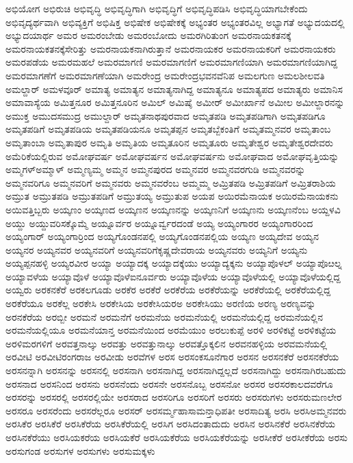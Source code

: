 {ಅಭಿಯೋಗ
ಅಭಿರುಚಿ
ಅಭಿವೃದ್ಧಿ
ಅಭಿವೃದ್ಧಿಗಾಗಿ
ಅಭಿವೃದ್ಧಿಗೆ
ಅಭಿವೃದ್ಧಿಪಡಿಸಿ
ಅಭಿವೃದ್ಧಿಯಾಗಬೇಕೆಂದು
ಅಭಿವೃದ್ಯರ್ಥವಾಗಿ
ಅಭಿವ್ಯಕ್ತಿಗೆ
ಅಭಿಷಿಕ್ತ
ಅಭಿಷೇಕ
ಅಭಿಷೇಕಕ್ಕೆ
ಅಭ್ಯಂತರ
ಅಭ್ಯಂತರವಿಲ್ಲ
ಅಭ್ಯಾಗತೆ
ಅಭ್ಯುದಯದಲ್ಲಿ
ಅಭ್ಯುದಯಾರ್ಥ
ಅಮರ
ಅಮರಂಬೇಡು
ಅಮರಂಬೋದು
ಅಮರಗಿರಿತುಂಗ
ಅಮರನಾಯಕತನಕ್ಕೆ
ಅಮರನಾಯಕತನಕ್ಕೆಸೇರಿತ್ತು
ಅಮರನಾಯಕನಾಗಿರುತ್ತಾನೆ
ಅಮರನಾಯಕರ
ಅಮರನಾಯಕರಿಗೆ
ಅಮರನಾಯಕರು
ಅಮರಪಡೆಯ
ಅಮರಮಹಲೆ
ಅಮರಮಾಗಣಿ
ಅಮರಮಾಗಣಿಗೆ
ಅಮರಮಾಗಣಿಯಾಗಿ
ಅಮರಮಾಗಣಿಯಾಗಿದ್ದ
ಅಮರಮಾಗಣೆಗೆ
ಅಮರಮಾಗಣೆಯಾಗಿ
ಅಮರೇಂದ್ರ
ಅಮರೇಂದ್ರಭವನವೆನಿಪ
ಅಮಲಗುಣ
ಅಮಲಶೀಲವತಿ
ಅಮಲ್ದಾರ್
ಅಮಳವೂರ್
ಅಮಾತ್ಯ
ಅಮಾತ್ಯನ
ಅಮಾತ್ಯನಾಗಿದ್ದ
ಅಮಾತ್ಯನೂ
ಅಮಾತ್ಯಪದ
ಅಮಾತ್ಯರು
ಅಮಾನಿಸ
ಅಮಾವಾಸ್ಯೆಯ
ಅಮಿತ್ತನೂರ
ಅಮಿತ್ತನೂರಿನ
ಅಮಿಲ್
ಅಮಿಷೈ
ಅಮೀರ್
ಅಮೀರ್ಖಾನೆ
ಅಮೀಲ
ಅಮೀಲ್ದಾರನನ್ನು
ಅಮುಕ್ತ
ಅಮುದಸಮುದ್ರ
ಅಮುಲ್ದಾರ್
ಅಮೃತನಾಥಪುರವಾದ
ಅಮೃತಪಡಿ
ಅಮೃತಪಡಿಗಾಗಿ
ಅಮೃತಪಡಿಗೂ
ಅಮೃತಪಡಿಗೆ
ಅಮೃತಪಡಿಯ
ಅಮೃತಪಡಿಯನೂ
ಅಮೃತಪ್ಪನ
ಅಮೃತಬ್ಬೆಕಂತಿಗೆ
ಅಮೃತಮ್ಮನವರ
ಅಮೃತಾಂಬ
ಅಮೃತಾಂಬಾ
ಅಮೃತಾಪುರ
ಅಮೃತಿ
ಅಮೃತಿಯ
ಅಮೃತೂರಿನ
ಅಮೃತೂರು
ಅಮೃತೇಶ್ವರ
ಅಮೃತೇಶ್ವರದೇವರು
ಅಮೆರಿಕೆಯಲ್ಲಿರುವ
ಅಮೋಘವರ್ಷ
ಅಮೋಘವರ್ಷನ
ಅಮೋಘವರ್ಷನು
ಅಮೋಘವಾದ
ಅಮೋಘವೃತ್ತಿಯನ್ನು
ಅಮ್ಮಗಳ್ಅಮ್ಮಾಳ್
ಅಮ್ಮಣ್ಯಮ್ಮ
ಅಮ್ಮನ
ಅಮ್ಮನಪುರದ
ಅಮ್ಮನವರ
ಅಮ್ಮನವರಗುಡಿ
ಅಮ್ಮನವರನ್ನು
ಅಮ್ಮನವರಿಗೂ
ಅಮ್ಮನವರಿಗೆ
ಅಮ್ಮನವರು
ಅಮ್ಮನವರೆಂಬ
ಅಮ್ಮಮ್ಮ
ಅಮ್ರಿತಪಡಿ
ಅಮ್ರಿತಪಡಿಗೆ
ಅಮ್ರಿತರಾಶಿಯ
ಅಮ್ರುತ
ಅಮ್ರುತಪಡಿ
ಅಮ್ರುತಪಡಿಗೆ
ಅಮ್ರುತಯ್ಯ
ಅಮ್ರುತುಪ
ಅಯಪ
ಅಯಿರಮೆನಾಯಕ
ಅಯಿರಮೆನಾಯಕನು
ಅಯಿವತ್ತಿಬ್ಬರು
ಅಯ್ಕಣಂ
ಅಯ್ಕಣದ
ಅಯ್ಕಣನ
ಅಯ್ಕಣನನ್ನು
ಅಯ್ಕಣನಿಗೆ
ಅಯ್ಕಣನು
ಅಯ್ಕಣನೆಂಬ
ಅಯ್ದಳವಿ
ಅಯ್ದು
ಅಯ್ದುವರಿಸಕ್ಕೊಮ್ಮೆ
ಅಯ್ನೂರ್ವರ
ಅಯ್ನೂರ್ವ್ವರದಂಡೆ
ಅಯ್ಯ
ಅಯ್ಯಂಗಾರರ
ಅಯ್ಯಂಗಾರರಿಂದ
ಅಯ್ಯಂಗಾರ್
ಅಯ್ಯಂಗಾರ್ರಿಂದ
ಅಯ್ಯಗೊಂಡನಪಲ್ಲಿ
ಅಯ್ಯಗೊಂಡನಪಲ್ಲಿಯ
ಅಯ್ಯಣ
ಅಯ್ಯದೇವ
ಅಯ್ಯನ
ಅಯ್ಯನರ
ಅಯ್ಯನವರ
ಅಯ್ಯನವರಿಗೆ
ಅಯ್ಯನವರಿಗೆಕೃಷ್ಣದೇವರಾಯ
ಅಯ್ಯನವರು
ಅಯ್ಯನಿಗೆ
ಅಯ್ಯನು
ಅಯ್ಯಪ್ಪನಹಳ್ಳಿ
ಅಯ್ಯರವೀರ
ಅಯ್ಯಾ
ಅಯ್ಯಾದಕ್ಕ
ಅಯ್ಯಾದಕ್ಕೆಯು
ಅಯ್ಯಾದ್ಯಕ್ಕನು
ಅಯ್ಯಾಪೊಳಲ್
ಅಯ್ಯಾಪೊೞಲ್ನ
ಅಯ್ಯಾವಳೆಯ
ಅಯ್ಯಾವೊಳೆ
ಅಯ್ಯಾವೊಳೆಐನೂರ್ವರು
ಅಯ್ಯಾವೊಳೆಯ
ಅಯ್ಯಾವೊಳೆಯಲ್ಲಿ
ಅಯ್ಯಾವೊಳೆಯಲ್ಲಿದ್ದ
ಅಯ್ವರು
ಅರಕನಕೆರೆ
ಅರಕಲಗೂಡು
ಅರಕೆರ
ಅರಕೆರೆ
ಅರಕೆರೆಯ
ಅರಕೆರೆಯನ್ನು
ಅರಕೆರೆಯಲ್ಲಿ
ಅರಕೆರೆಯಲ್ಲಿದ್ದ
ಅರಕೆರೆಯೂ
ಅರಕೆಲ್ಲ
ಅರಕೇಸಿ
ಅರಕೇಸಿಯ
ಅರಕೇಸಿಯರಅ
ಅರಕೇಸಿಯು
ಅರಣಿಯ
ಅರಣ್ಯ
ಅರಣ್ಯವನ್ನು
ಅರನಕೆರೆಯ
ಅರಬ್ಬೀ
ಅರಮನೆ
ಅರಮನೆಗೆ
ಅರಮನೆಯ
ಅರಮನೆಯಲ್ಲಿ
ಅರಮನೆಯಲ್ಲಿದ್ದ
ಅರಮನೆಯಲ್ಲಿನ
ಅರಮನೆಯಲ್ಲಿಯೂ
ಅರಮನೆಯಾನ್ತ
ಅರಮನೆಯಿಂದ
ಅರಮೆಯುಂ
ಅರಲುಕುಪ್ಪೆ
ಅರಳಿ
ಅರಳಿಕಟ್ಟೆ
ಅರಳಿಕಟ್ಟೆಯ
ಅರಳಿಮರಗಳಿಗೆ
ಅರವತ್ತನಾಲ್ಕು
ಅರವತ್ತು
ಅರವತ್ತುನಾಲ್ಕು
ಅರವತ್ತೊಕ್ಕಲಿನ
ಅರವನಹಳ್ಳಿಯ
ಅರವಮನೆಯಲ್ಲಿ
ಅರವೀಟಿ
ಅರವೀಟಿರಂಗರಾಜ
ಅರವೀಡು
ಅರವೆಗಳ
ಅರಸ
ಅರಸಂಕಸೂನೆಗಾರ
ಅರಸನ
ಅರಸನಕೆರೆ
ಅರಸನಕೆರೆಯ
ಅರಸನನ್ನಾಗಿ
ಅರಸನನ್ನು
ಅರಸನಲ್ಲಿ
ಅರಸನಾಗಿ
ಅರಸನಾಗಿದ್ದ
ಅರಸನಾಗಿದ್ದಲ್ಲದೆ
ಅರಸನಾಗಿದ್ದು
ಅರಸನಾಗಿರಬಹುದು
ಅರಸನಾದ
ಅರಸನಿಂದ
ಅರಸನು
ಅರಸನೆಂದು
ಅರಸನೇ
ಅರಸನೊಬ್ಬ
ಅರಸನೋ
ಅರಸರ
ಅರಸರಕಾಲದವರೆಗೂ
ಅರಸರನ್ನು
ಅರಸರಲ್ಲಿ
ಅರಸರಲ್ಲಿಯೇ
ಅರಸರಾದ
ಅರಸರಿಗೂ
ಅರಸರಿಗೆ
ಅರಸರು
ಅರಸರುಗಳು
ಅರಸರುಮಣಲೇರ
ಅರಸರೂ
ಅರಸರೆಂದು
ಅರಸರೆಲ್ಲರೂ
ಅರಸರ್
ಅರಸರ್ಮ್ಮಹಾಸಾಮನ್ತಾಧಿಪತೀ
ಅರಸಾದಿತ್ಯ
ಅರಸಿ
ಅರಸಿಅಮ್ಮನವರು
ಅರಸಿಕೆರ
ಅರಸಿಕೆರೆ
ಅರಸಿಕೆರೆಯ
ಅರಸಿಕೆರೆಯಲ್ಲಿ
ಅರಸಿಗ
ಅರಸಿದಂತಾದುದು
ಅರಸಿನ
ಅರಸಿನಕೆರೆ
ಅರಸಿನಕೆರೆಯ
ಅರಸಿನಕೆರೆಯು
ಅರಸಿಯಕರೆಯ
ಅರಸಿಯಕೆರೆ
ಅರಸಿಯಕೆರೆಯ
ಅರಸಿಯಕೆರೆಯನ್ನು
ಅರಸೀಕೆರೆ
ಅರಸೀಕೆರೆಯ
ಅರಸು
ಅರಸುಗಂಡ
ಅರಸುಗಳ
ಅರಸುಗಳು
ಅರಸುಮಕ್ಕಳು
}
